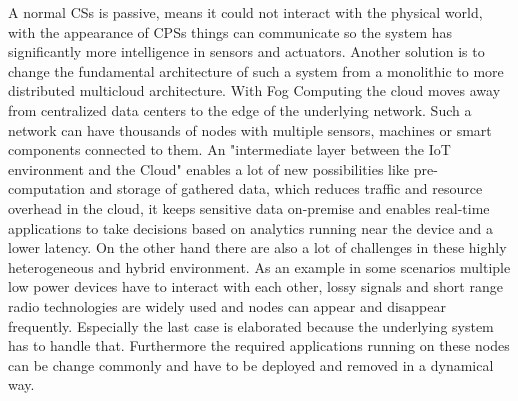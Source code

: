 A normal \acp{CS} is passive, means it could not interact with the physical world, with the appearance of \acp{CPS} things can communicate so the system has significantly more intelligence in sensors and actuators.\autocite[cf.][p. 1363 f.]{Poovendran:2010}
\newpage
Another solution is to change the fundamental architecture of such a system from a monolithic to more distributed multicloud architecture.
With Fog Computing the cloud moves away from centralized data centers to the edge of the underlying network.\autocite[cf.][p. 380]{Pahl:2015}
Such a network can have thousands of nodes with multiple sensors, machines or smart components connected to them.
An "intermediate layer between the IoT environment and the Cloud"\autocite[p.236]{Brito:2016} enables a lot of new possibilities like pre-computation and storage of gathered data, which reduces traffic and resource overhead in the cloud, it keeps sensitive data on-premise\autocite[cf.][p.236]{Brito:2016} and enables real-time applications to take decisions based on analytics running near the device and a lower latency.
On the other hand there are also a lot of challenges in these highly heterogeneous and hybrid environment.
As an example in some scenarios multiple low power devices have to interact with each other, lossy signals and short range radio technologies are widely used and nodes can appear and disappear frequently.\autocite[cf.][p. 325]{Yannuzzi:2014}
Especially the last case is elaborated because the underlying system has to handle that.
Furthermore the required applications running on these nodes can be change commonly and have to be deployed and removed in a dynamical way.


